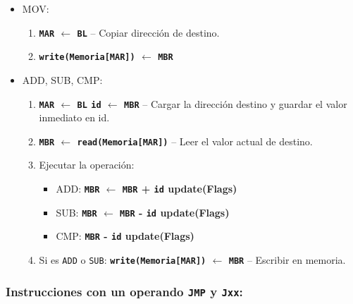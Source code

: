 \documentclass[12pt,oneside]{templates/unerthesis}
\providecommand{\tightlist}{%
  \setlength{\itemsep}{0pt}\setlength{\parskip}{0pt}}
\begin{document}
\begin{itemize}
\begin{itemize}
    \begin{itemize}
    \tightlist
    \item
      MOV:

      \begin{enumerate}
      \def\labelenumi{\arabic{enumi}.}
      \setcounter{enumi}{5}
      \tightlist
      \item
        \textbf{\texttt{MAR} \(\leftarrow\) \texttt{BL}} -- Copiar dirección de destino.
      \item
        \textbf{\texttt{write(Memoria{[}MAR{]})} \(\leftarrow\) \texttt{MBR}}
      \end{enumerate}
    \item
      ADD, SUB, CMP:

      \begin{enumerate}
      \def\labelenumi{\arabic{enumi}.}
      \setcounter{enumi}{5}
      \tightlist
      \item
        \textbf{\texttt{MAR} \(\leftarrow\) \texttt{BL} \textbar{} \texttt{id} \(\leftarrow\) \texttt{MBR}} -- Cargar la dirección destino y guardar el valor inmediato en id.
      \item
        \textbf{\texttt{MBR} \(\leftarrow\) \texttt{read(Memoria{[}MAR{]})}} -- Leer el valor actual de destino.
      \item
        Ejecutar la operación:

        \begin{itemize}
        \tightlist
        \item
          ADD: \textbf{\texttt{MBR} \(\leftarrow\) \texttt{MBR} + \texttt{id} \textbar{} update(Flags)}
        \item
          SUB: \textbf{\texttt{MBR} \(\leftarrow\) \texttt{MBR} - \texttt{id} \textbar{} update(Flags)}
        \item
          CMP: \textbf{\texttt{MBR} - \texttt{id} \textbar{} update(Flags)}
        \end{itemize}
      \item
        Si es \texttt{ADD} o \texttt{SUB}: \textbf{\texttt{write(Memoria{[}MAR{]})} \(\leftarrow\) \texttt{MBR}} -- Escribir en memoria.
      \end{enumerate}
    \end{itemize}
  \end{itemize}
\end{itemize}

\hypertarget{instrucciones-con-un-operando-jmp-y-jxx}{%
\subsubsection{\texorpdfstring{Instrucciones con un operando \texttt{JMP} y \texttt{Jxx}:}{Instrucciones con un operando JMP y Jxx:}}\label{instrucciones-con-un-operando-jmp-y-jxx}}
\end{document}
